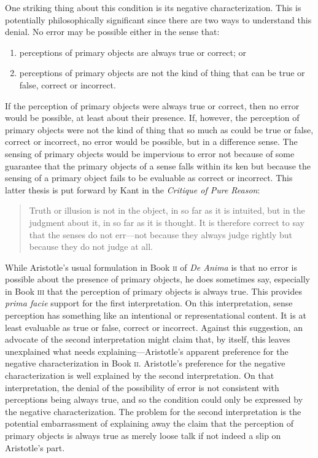 One striking thing about this condition is its negative characterization. This is potentially philosophically significant since there are two ways to understand this denial. No error may be possible either in the sense that:
\begin{enumerate}[(1)]
	\item perceptions of primary objects are always true or correct; or
	\item perceptions of primary objects are not the kind of thing that can be true or false, correct or incorrect.
\end{enumerate}
If the perception of primary objects were always true or correct, then no error would be possible, at least about their presence. If, however, the perception of primary objects were not the kind of thing that so much as could be true or false, correct or incorrect, no error would be possible, but in a difference sense. The sensing of primary objects would be impervious to error not because of some guarantee that the primary objects of a sense falls within its ken but because the sensing of a primary object fails to be evaluable as correct or incorrect. This latter thesis is put forward by Kant in the \emph{Critique of Pure Reason}:
\begin{quote}
	Truth or illusion is not in the object, in so far as it is intuited, but in the judgment about it, in so far as it is thought. It is therefore correct to say that the senses do not err---not because they always judge rightly but because they do not judge at all. \citep[\textsc{a}294/\textsc{b}350]{Kant:1781fk}
\end{quote}

While Aristotle's usual formulation in Book \textsc{ii} of \emph{De Anima} is that no error is possible about the presence of primary objects, he does sometimes say, especially in Book \textsc{iii} that the perception of primary objects is always true. This provides \emph{prima facie} support for the first interpretation. On this interpretation, sense perception has something like an intentional or representational content. It is at least evaluable as true or false, correct or incorrect. Against this suggestion, an advocate of the second interpretation might claim that, by itself, this leaves unexplained what needs explaining---\-Aristotle's apparent preference for the negative characterization in Book \textsc{ii}. Aristotle's preference for the negative characterization is well explained by the second interpretation. On that interpretation, the denial of the possibility of error is not consistent with perceptions being always true, and so the condition could only be expressed by the negative characterization. The problem for the second interpretation is the potential embarrassment of explaining away the claim that the perception of primary objects is always true as merely loose talk if not indeed a slip on Aristotle's part.

